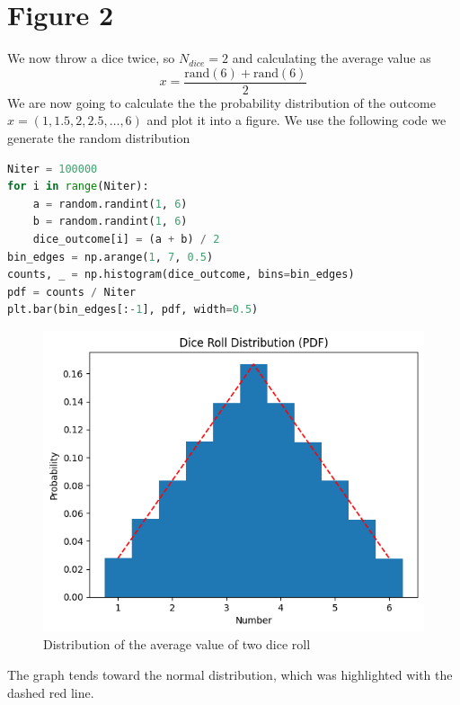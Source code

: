 \documentclass{article}
\begin{document}
\section{Figure 2}
We now throw a dice twice, so $N_{dice}=2$ and calculating the average value as
\begin{equation}
    x=\frac{\text{rand}(6)+\text{rand}(6)}2
\end{equation}
We are now going to calculate the the probability distribution of the outcome $x=(1,1.5,2,2.5,\dots,6)$ and plot it into a figure. We use the following code we generate the random distribution
\begin{lstlisting}[language=Python]
Niter = 100000
for i in range(Niter):
    a = random.randint(1, 6)
    b = random.randint(1, 6)
    dice_outcome[i] = (a + b) / 2
bin_edges = np.arange(1, 7, 0.5)
counts, _ = np.histogram(dice_outcome, bins=bin_edges)
pdf = counts / Niter
plt.bar(bin_edges[:-1], pdf, width=0.5)
\end{lstlisting}
\begin{figure}[H]
    \centering
    \includegraphics[width=.9\linewidth]{images/Figure2.png}
    \caption{Distribution of the average value of two dice roll}
    \label{fig:2}
\end{figure}
The graph tends toward the normal distribution, which was highlighted with the dashed red line.
\clearpage
\end{document}

